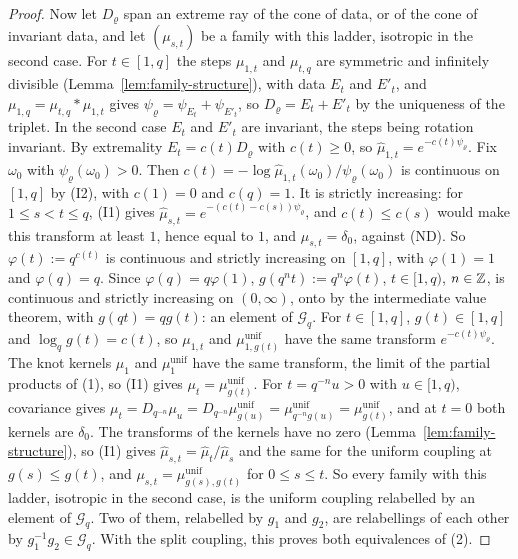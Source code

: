 \begin{proof}
Now let $D_\varrho$ span an extreme ray of the cone of data, or of the cone of invariant data, and let
$(\mu_{s,t})$ be a family with this ladder, isotropic in the second case. For $t \in [1, q]$ the
steps $\mu_{1,t}$ and $\mu_{t,q}$ are symmetric and infinitely divisible
(Lemma~\ref{lem:family-structure}), with data $E_t$ and $E'_t$, and
$\mu_{1,q} = \mu_{t,q} * \mu_{1,t}$ gives $\psi_\varrho = \psi_{E_t} + \psi_{E'_t}$, so
$D_\varrho = E_t + E'_t$ by the uniqueness of the triplet. In the second case $E_t$ and $E'_t$ are
invariant, the steps being rotation invariant. By extremality $E_t = c(t)D_\varrho$ with
$c(t) \ge 0$, so $\widehat\mu_{1,t} = e^{-c(t)\psi_\varrho}$. Fix $\omega_0$ with
$\psi_\varrho(\omega_0) > 0$. Then $c(t) = -\log\widehat\mu_{1,t}(\omega_0)/\psi_\varrho(\omega_0)$
is continuous on $[1, q]$ by (I2), with $c(1) = 0$ and $c(q) = 1$. It is strictly increasing: for
$1 \le s < t \le q$, (I1) gives $\widehat\mu_{s,t} = e^{-(c(t) - c(s))\psi_\varrho}$, and
$c(t) \le c(s)$ would make this transform at least $1$, hence equal to $1$, and
$\mu_{s,t} = \delta_0$, against (ND). So $\varphi(t) := q^{c(t)}$ is continuous and strictly
increasing on $[1, q]$, with $\varphi(1) = 1$ and $\varphi(q) = q$. Since $\varphi(q) = q\varphi(1)$,
$g(q^nt) := q^n\varphi(t)$, $t \in [1, q)$, $n \in \mathbb{Z}$, is continuous and strictly increasing
on $(0, \infty)$, onto by the intermediate value theorem, with $g(qt) = qg(t)$: an element of
$\mathcal{G}_q$. For $t \in [1, q]$,
$g(t) \in [1, q]$ and $\log_qg(t) = c(t)$, so $\mu_{1,t}$ and $\mu^{\mathrm{unif}}_{1,g(t)}$ have the
same transform $e^{-c(t)\psi_\varrho}$. The knot kernels $\mu_1$ and $\mu^{\mathrm{unif}}_1$ have the
same transform, the limit of the partial products of (1), so (I1) gives
$\mu_t = \mu^{\mathrm{unif}}_{g(t)}$. For $t = q^{-n}u > 0$ with $u \in [1, q)$, covariance gives
$\mu_t = D_{q^{-n}}\mu_u = D_{q^{-n}}\mu^{\mathrm{unif}}_{g(u)} = \mu^{\mathrm{unif}}_{q^{-n}g(u)}
= \mu^{\mathrm{unif}}_{g(t)}$, and at $t = 0$ both kernels are $\delta_0$. The transforms of the
kernels have no zero (Lemma~\ref{lem:family-structure}), so (I1) gives
$\widehat\mu_{s,t} = \widehat\mu_t/\widehat\mu_s$ and the same for the uniform coupling at
$g(s) \le g(t)$, and $\mu_{s,t} = \mu^{\mathrm{unif}}_{g(s),g(t)}$ for $0 \le s \le t$. So every
family with this ladder, isotropic in the second case, is the uniform coupling relabelled by an
element of $\mathcal{G}_q$. Two of them, relabelled by $g_1$ and $g_2$, are relabellings of each
other by $g_1^{-1}g_2 \in \mathcal{G}_q$. With the split coupling, this proves both equivalences of
(2).


\end{proof}

